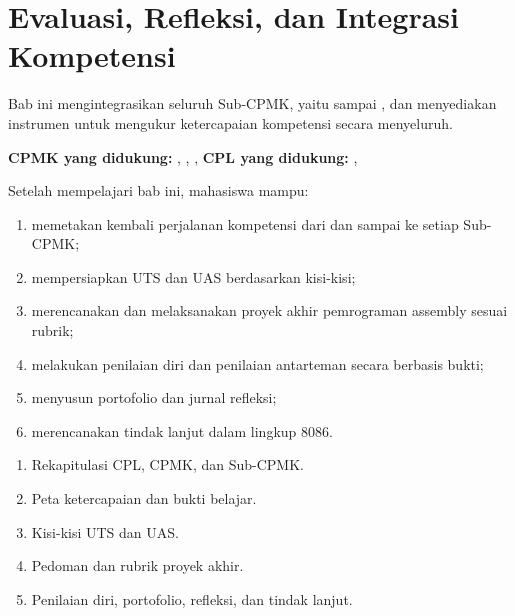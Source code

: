 \documentclass[../../main.tex]{subfiles}
\begin{document}
\chapter{Evaluasi, Refleksi, dan Integrasi Kompetensi}
\label{chap:evaluasi-akhir}


\begin{subcpmkbox}
\vspace{1.1em}
Bab ini mengintegrasikan seluruh Sub-CPMK, yaitu 
sampai , dan menyediakan instrumen untuk mengukur
ketercapaian kompetensi secara menyeluruh.

\vspace{0.4em}
\textbf{CPMK yang didukung:} , , ,
 \quad\textbullet\quad
\textbf{CPL yang didukung:} , 
\end{subcpmkbox}

\begin{tujuanbox}
\vspace{1.1em}
Setelah mempelajari bab ini, mahasiswa mampu:
\begin{enumerate}
    \item memetakan kembali perjalanan kompetensi dari  dan
           sampai ke setiap Sub-CPMK;
    \item mempersiapkan UTS dan UAS berdasarkan kisi-kisi;
    \item merencanakan dan melaksanakan proyek akhir pemrograman
          assembly sesuai rubrik;
    \item melakukan penilaian diri dan penilaian antarteman secara
          berbasis bukti;
    \item menyusun portofolio dan jurnal refleksi;
    \item merencanakan tindak lanjut dalam lingkup 8086.
\end{enumerate}
\end{tujuanbox}

\begin{materibox}
\vspace{1.1em}
\begin{enumerate}
    \item Rekapitulasi CPL, CPMK, dan Sub-CPMK.
    \item Peta ketercapaian dan bukti belajar.
    \item Kisi-kisi UTS dan UAS.
    \item Pedoman dan rubrik proyek akhir.
    \item Penilaian diri, portofolio, refleksi, dan tindak lanjut.
\end{enumerate}
\end{materibox}










\end{document}
